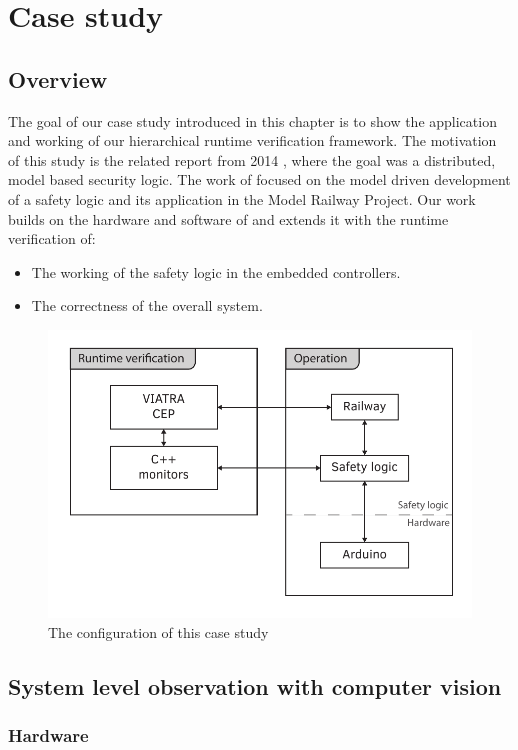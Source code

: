\chapter{Case study}
\label{chap:case_study}

\section{Overview}

The goal of our case study introduced in this chapter is to show the application and working of our hierarchical runtime verification framework. The motivation of this study is the related report from 2014 \citep{tdk2014}, where the goal was a distributed, model based security logic. The work of \citep{tdk2014} focused on the model driven development of a safety logic and its application in the Model Railway Project. Our work builds on the hardware and software of \citep{tdk2014} and extends it with the runtime verification of:
\begin{itemize}
	\item The working of the safety logic in the embedded controllers.
	\item The correctness of the overall system.
\end{itemize}

\begin{figure}[h]
	\centering
	\includegraphics[width=0.65\linewidth]{include/figures/chapter_6/concept_1}
	\caption{The configuration of this case study}
	\label{fig:case_study:final_marker} 
\end{figure}

\section{System level observation with computer vision}

\subsection{Hardware}
\label{sec:case_study:hardware}

